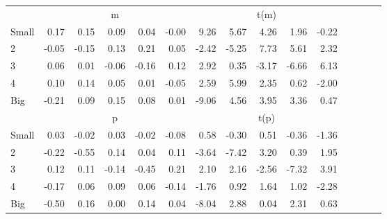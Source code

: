 \begin{table}[!ht]
\begin{tabular}{lrrrrrrrrrrrrrr}
      & \multicolumn{5}{c}{m} & \multicolumn{5}{c}{t(m)}
    
    \\
      \cmidrule(r){2-6} \cmidrule(r){7-11}

    Small   & 0.17  & 0.15  & 0.09  & 0.04  & -0.00  & 9.26  & 5.67  & 4.26  & 1.96  & -0.22  \\
         2  & -0.05  & -0.15  & 0.13  & 0.21  & 0.05  & -2.42  & -5.25  & 7.73  & 5.61  & 2.32  \\
         3  & 0.06  & 0.01  & -0.06  & -0.16  & 0.12  & 2.92  & 0.35  & -3.17  & -6.66  & 6.13  \\
         4  & 0.10  & 0.14  & 0.05  & 0.01  & -0.05  & 2.59  & 5.99  & 2.35  & 0.62  & -2.00  \\
    Big     & -0.21  & 0.09  & 0.15  & 0.08  & 0.01  & -9.06  & 4.56  & 3.95  & 3.36  & 0.47  \\

  
    
      & \multicolumn{5}{c}{p} & \multicolumn{5}{c}{t(p)}
    
    \\
      \cmidrule(r){2-6} \cmidrule(r){7-11}

    Small   & 0.03  & -0.02  & 0.03  & -0.02  & -0.08  & 0.58  & -0.30  & 0.51  & -0.36  & -1.36  \\
         2  & -0.22  & -0.55  & 0.14  & 0.04  & 0.11  & -3.64  & -7.42  & 3.20  & 0.39  & 1.95  \\
         3  & 0.12  & 0.11  & -0.14  & -0.45  & 0.21  & 2.10  & 2.16  & -2.56  & -7.32  & 3.91  \\
         4  & -0.17  & 0.06  & 0.09  & 0.06  & -0.14  & -1.76  & 0.92  & 1.64  & 1.02  & -2.28  \\
    Big     & -0.50  & 0.16  & 0.00  & 0.14  & 0.04  & -8.04  & 2.88  & 0.04  & 2.31  & 0.63  \\

  

  \bottomrule
\end{tabular}
\label{tbl:25_Size_NI_B16}
\end{table}